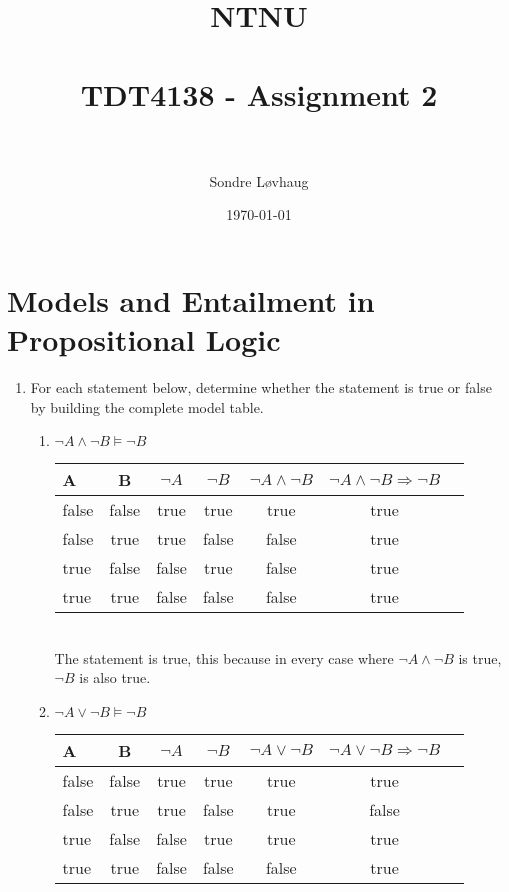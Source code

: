 \documentclass[paper=a4, fontsize=11pt]{scrartcl} %
\title{	
\normalfont \normalsize 
\textsc{NTNU} \\ [25pt] %
\horrule{0.5pt} \\[0.4cm] %
\huge TDT4138 - Assignment 2 \\ %
\horrule{2pt} \\[0.5cm] %
}
\author{Sondre Løvhaug} %
\date{\normalsize\today} %
\numberwithin{equation}{section} %
\numberwithin{figure}{section} %
\numberwithin{table}{section} %
\begin{document}
\maketitle %


\section{Models and Entailment in Propositional Logic}

\begin{enumerate}
	\item 
	For each statement below, determine whether the statement is true or false by building the complete
	model table.
	

	
	\begin{enumerate}
		\item %
		$\neg A \wedge \neg B \models \neg B$

		\begin{tabular}{l c c c c c c}
		\hline 
		A & B & $\neg A $ & $ \neg B $ & $ \neg A \wedge \neg B $ & $ \neg A \wedge \neg B \Rightarrow \neg B $ \\
		\hline
		false & false & true & true & true & true \\
		false & true & true & false & false & true \\
		true & false & false & true & false & true \\
		true & true & false & false & false & true \\
		\end{tabular}
		\\

		The statement is true, this because in every case where $\neg A \wedge \neg B$ is true, $\neg B$ is also true.\\

		\item %
		$\neg A \vee \neg B \models \neg B$

		\begin{tabular}{l c c c c c c}
			\hline 
			A & B & $\neg A $ & $ \neg B $ & $ \neg A \vee \neg B $ & $ \neg A \vee \neg B \Rightarrow \neg B $ \\
			\hline
			false 	& false 	& true 		& true 		& true 		& true \\
			false 	& true 		& true 		& false 	& true 		& false \\
			true 	& false 	& false 	& true 		& true 		& true \\
			true 	& true 		& false 	& false 	& false 	& true \\
		\end{tabular}
		\\
		

\end{enumerate}
\end{enumerate}
\end{document}
